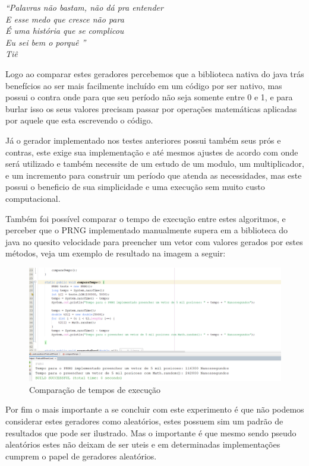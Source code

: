 
	\begin{flushright}
		\textit{``Palavras não bastam, não dá pra entender\\
                    E esse medo que cresce não para\\
                    É uma história que se complicou\\
                    Eu sei bem o porquê ''\\Tiê}
	    \end{flushright}
	    
	    Logo ao comparar estes geradores percebemos que a biblioteca nativa do java trás benefícios ao ser mais facilmente incluído em um código por ser nativo, mas possui o contra onde para que seu período não seja somente entre 0 e 1, e para burlar isso os seus valores precisam passar por operações matemáticas aplicadas por aquele que esta escrevendo o código.
	    
	    Já o gerador implementado nos testes anteriores possui também seus prós e contras, este exige sua implementação e até mesmos ajustes de acordo com onde será utilizado e também necessite de um estudo de um modulo, um multiplicador, e um incremento para construir um período que atenda as necessidades, mas este possui o beneficio de sua simplicidade e uma execução sem muito custo computacional.
	    
	    Também foi possível comparar o tempo de execução entre estes algoritmos, e perceber que o PRNG implementado manualmente supera em a biblioteca do java no quesito velocidade para preencher um vetor com valores gerados por estes métodos, veja um exemplo de resultado na imagem a seguir:
	    
	    \begin{figure}[ht]
            \centering
            \includegraphics[scale=0.4]{JoseGeraldo-lista2/fig/fig6.png}
            \caption{Comparação de tempos de execução}
        \end{figure}
        
    \pagebreak
	    Por fim o mais importante a se concluir com este experimento é que não podemos considerar estes geradores como aleatórios, estes possuem sim um padrão de resultados que pode ser ilustrado.
	    Mas o importante é que mesmo sendo pseudo aleatórios estes não deixam de ser uteis e em determinadas implementações cumprem o papel de geradores aleatórios.